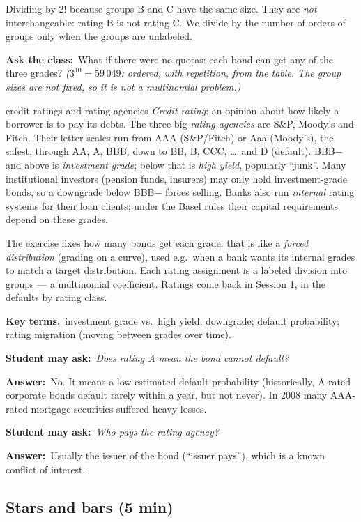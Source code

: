 \documentclass[11pt,a4paper,parskip=half]{scrartcl}
\newcommand{\terms}{\par\textbf{\color{plum}Key terms.}\ }
\newcommand{\sq}[1]{\par\textbf{\color{plum}Student may ask:}\ \emph{#1}\par}
\newcommand{\ans}{\textbf{Answer:}\ }
\newcommand{\ask}{\textbf{\color{navy}Ask the class:}\ }
\begin{document}
\begin{mistake}
	Dividing by $2!$ because groups B and C have the same size. They are
	\emph{not} interchangeable: rating B is not rating C. We divide by the
	number of orders of groups only when the groups are unlabeled.
\end{mistake}

\ask What if there were no quotas: each bond can get any of the three
grades? \emph{($3^{10}=59\,049$: ordered, with repetition, from the table.
The group sizes are not fixed, so it is not a multinomial problem.)}

\begin{bg}{credit ratings and rating agencies}
	\emph{Credit rating}: an opinion about how likely a borrower is to pay its
	debts. The three big \emph{rating agencies} are S\&P, Moody's and Fitch.
	Their letter scales run from AAA (S\&P/Fitch) or Aaa (Moody's), the
	safest, through AA, A, BBB, down to BB, B, CCC, \ldots\ and D (default).
	BBB$-$ and above is \emph{investment grade}; below that is \emph{high
		yield}, popularly ``junk''. Many institutional investors (pension funds,
	insurers) may only hold investment-grade bonds, so a downgrade below BBB$-$
	forces selling. Banks also run \emph{internal} rating systems for their
	loan clients; under the Basel rules their capital requirements depend on
	these grades.

	The exercise fixes how many bonds get each grade: that is like a
	\emph{forced distribution} (grading on a curve), used e.g.\ when a bank
	wants its internal grades to match a target distribution. Each rating
	assignment is a labeled division into groups --- a multinomial
	coefficient. Ratings come back in Session 1, in the defaults by rating
	class.

	\terms investment grade vs.\ high yield; downgrade; default probability;
	rating migration (moving between grades over time).

	\sq{Does rating A mean the bond cannot default?}
	\ans No. It means a low estimated default probability (historically,
	A-rated corporate bonds default rarely within a year, but not never). In
	2008 many AAA-rated mortgage securities suffered heavy losses.

	\sq{Who pays the rating agency?}
	\ans Usually the issuer of the bond (``issuer pays''), which is a known
	conflict of interest.
\end{bg}

\subsection{Stars and bars (5 min)}
\end{document}
